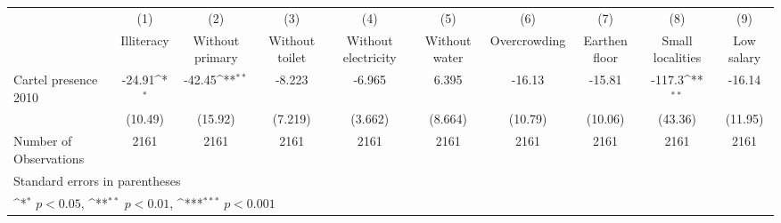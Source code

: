 {
\def\sym#1{\ifmmode^{#1}\else\(^{#1}\)\fi}
\begin{tabular}{l*{9}{c}}
\hline\hline
                    &\multicolumn{1}{c}{(1)}&\multicolumn{1}{c}{(2)}&\multicolumn{1}{c}{(3)}&\multicolumn{1}{c}{(4)}&\multicolumn{1}{c}{(5)}&\multicolumn{1}{c}{(6)}&\multicolumn{1}{c}{(7)}&\multicolumn{1}{c}{(8)}&\multicolumn{1}{c}{(9)}\\
                    &\multicolumn{1}{c}{Illiteracy}&\multicolumn{1}{c}{Without primary}&\multicolumn{1}{c}{Without toilet}&\multicolumn{1}{c}{Without electricity}&\multicolumn{1}{c}{Without water}&\multicolumn{1}{c}{Overcrowding}&\multicolumn{1}{c}{Earthen floor}&\multicolumn{1}{c}{Small localities}&\multicolumn{1}{c}{Low salary}\\
\hline
Cartel presence 2010&      -24.91\sym{*}  &      -42.45\sym{**} &      -8.223         &      -6.965         &       6.395         &      -16.13         &      -15.81         &      -117.3\sym{**} &      -16.14         \\
                    &     (10.49)         &     (15.92)         &     (7.219)         &     (3.662)         &     (8.664)         &     (10.79)         &     (10.06)         &     (43.36)         &     (11.95)         \\
\hline
Number of Observations&        2161         &        2161         &        2161         &        2161         &        2161         &        2161         &        2161         &        2161         &        2161         \\
\hline\hline
\multicolumn{10}{l}{\footnotesize Standard errors in parentheses}\\
\multicolumn{10}{l}{\footnotesize \sym{*} \(p<0.05\), \sym{**} \(p<0.01\), \sym{***} \(p<0.001\)}\\
\end{tabular}
}
